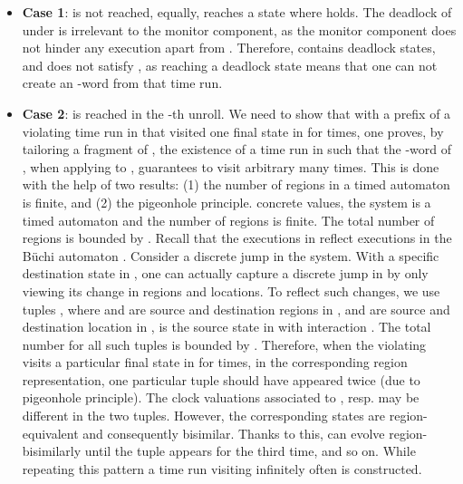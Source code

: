 \begin{itemize}
\item \textbf{Case 1}:  is not reached, equally,  reaches a state where  holds. The deadlock of  under  is irrelevant to the monitor component, as the monitor component does not hinder any execution apart from .  Therefore,  contains deadlock states, and 
  does not satisfy , as reaching a deadlock state means that one can not create an  -word from that time run. 
	






	\item \textbf{Case 2}:  is reached in the -th
          unroll. We need to show that with a prefix of a violating
          time run  in  that
          visited one final state  in
           for  times, one proves,
          by tailoring a fragment of , the existence of a time
          run  in  such that the
          -word of , when applying to
          , guarantees to visit 
          arbitrary many times.  This is done with the help of two results:
          (1) the number of regions in a timed automaton is finite,
          and (2) the pigeonhole principle.
concrete values, the system is a timed automaton and the
          number of regions is finite. The total number of regions is
          bounded by . Recall that the executions in  reflect executions in the B\"uchi automaton
          . Consider a discrete jump in
          the system. With a specific destination state  in
          , one can actually capture a
          discrete jump in  by only
          viewing its change in regions and locations. To reflect such
          changes, we use tuples , where
           and  are source and destination
          regions in ,  and
           are source and destination location in
          ,  is the source state in
           with interaction .  The total number for all such  tuples is bounded by .  Therefore, when
          the violating  visits a particular final state  in
           for  times, in the
          corresponding region representation, one particular tuple
           should
          have appeared twice (due to pigeonhole principle). The clock
          valuations associated to , resp.  may
          be different in the two tuples. However, the corresponding
          states are region-equivalent and consequently
          bisimilar. Thanks to this,  can evolve
          region-bisimilarly until the tuple  appears for the third time, and so on. While
          repeating this pattern a time run visiting  infinitely
          often is constructed.






		
		
	
		
		




		


	
		


	
\end{itemize}










